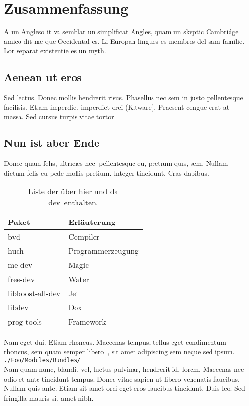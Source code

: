 \section{Zusammenfassung}

A un Angleso it va semblar un simplificat Angles, quam un skeptic Cambridge amico dit me que Occidental es. Li Europan lingues es membres del sam familie. Lor separat existentie es un myth.

\subsection{Aenean ut eros}

Sed lectus. Donec mollis hendrerit risus. Phasellus nec sem in justo pellentesque facilisis. Etiam imperdiet imperdiet orci (Kitware\cite{web:Kitware}). Praesent congue erat at massa. Sed cursus turpis vitae tortor.

\subsection{Nun ist aber Ende}

Donec quam felis, ultricies nec, pellentesque eu, pretium quis, sem. Nullam dictum felis eu pede mollis pretium. Integer tincidunt. Cras dapibus.

\begin{table}
	\begin{tabular}{|l|l|} 
		\hline
		\textbf{Paket} & \textbf{Erläuterung}\\
		\hline
		\hline
		bvd & Compiler\\
		\hline
		huch & Programmerzeugung\\
		\hline
		me-dev & Magic\\
		\hline
		free-dev & Water\\
		\hline
		libboost-all-dev & Jet\\
		\hline
		libdev & Dox\\
		\hline
		prog-tools & Framework\\
		\hline	
	\end{tabular}
	\caption{Liste der über hier und da \glqq dev\grqq\ enthalten.}
	\label{tab:packages}
\end{table}

Nam eget dui. Etiam rhoncus. Maecenas tempus, tellus eget condimentum rhoncus, \glqq sem quam semper libero\grqq\ , sit amet adipiscing sem neque sed ipsum. 
\\ \verb|./Foo/Modules/Bundles/|\\
Nam quam nunc, blandit vel, luctus pulvinar, hendrerit id, lorem. Maecenas nec odio et ante tincidunt tempus. Donec vitae sapien ut libero venenatis faucibus. Nullam quis ante. Etiam sit amet orci eget eros faucibus tincidunt. Duis leo. Sed fringilla mauris sit amet nibh.